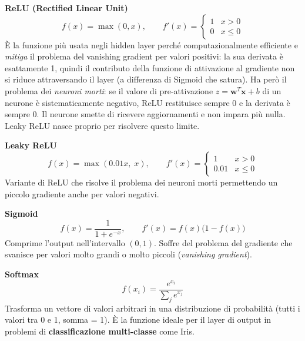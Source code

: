 \documentclass[12pt, a4paper]{article}
\begin{document}
\vspace{0.3cm}
\noindent\textbf{ReLU (Rectified Linear Unit)}
\begin{equation}
    f(x) = \max(0, x), \qquad f'(x) = \begin{cases} 1 & x > 0 \\ 0 & x \leq 0 \end{cases}
\end{equation}
È la funzione più usata negli hidden layer perché computazionalmente
efficiente e \emph{mitiga} il problema del vanishing gradient per
valori positivi: la sua derivata è esattamente 1, quindi il contributo
della funzione di attivazione al gradiente non si riduce attraversando
il layer (a differenza di Sigmoid che satura). Ha però il problema
dei \textit{neuroni morti}: se il valore di pre-attivazione
$z = \mathbf{w}^T\mathbf{x} + b$ di un neurone è sistematicamente
negativo, ReLU restituisce sempre 0 e la derivata è sempre 0.
Il neurone smette di ricevere aggiornamenti e non impara più nulla.
Leaky ReLU nasce proprio per risolvere questo limite.

\vspace{0.3cm}
\noindent\textbf{Leaky ReLU}
\begin{equation}
    f(x) = \max(0.01x,\; x), \qquad f'(x) = \begin{cases} 1 & x > 0 \\ 0.01 & x \leq 0 \end{cases}
\end{equation}
Variante di ReLU che risolve il problema dei neuroni morti permettendo un
piccolo gradiente anche per valori negativi.

\vspace{0.3cm}
\noindent\textbf{Sigmoid}
\begin{equation}
    f(x) = \frac{1}{1+e^{-x}}, \qquad f'(x) = f(x)\bigl(1-f(x)\bigr)
\end{equation}
Comprime l'output nell'intervallo $(0,1)$. Soffre del problema del gradiente
che svanisce per valori molto grandi o molto piccoli (\textit{vanishing gradient}).

\vspace{0.3cm}
\noindent\textbf{Softmax}
\begin{equation}
    f(x_i) = \frac{e^{x_i}}{\displaystyle\sum_j e^{x_j}}
\end{equation}
Trasforma un vettore di valori arbitrari in una distribuzione di probabilità
(tutti i valori tra 0 e 1, somma = 1). È la funzione ideale per il layer di
output in problemi di \textbf{classificazione multi-classe} come Iris.
\end{document}
